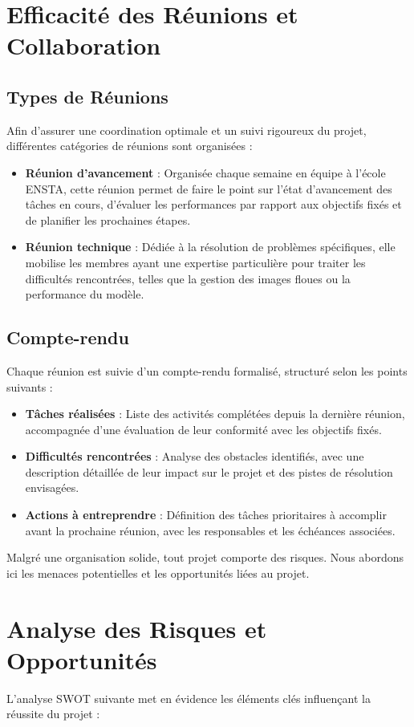 \section{Efficacité des Réunions et Collaboration}
\subsection{Types de Réunions}  
Afin d'assurer une coordination optimale et un suivi rigoureux du projet, différentes catégories de réunions sont organisées :  
\begin{itemize}  
    \item \textbf{Réunion d’avancement} : Organisée chaque semaine en équipe à l’école ENSTA, cette réunion permet de faire le point sur l’état d’avancement des tâches en cours, d’évaluer les performances par rapport aux objectifs fixés et de planifier les prochaines étapes.  
    \item \textbf{Réunion technique} : Dédiée à la résolution de problèmes spécifiques, elle mobilise les membres ayant une expertise particulière pour traiter les difficultés rencontrées, telles que la gestion des images floues ou la performance du modèle.   
\end{itemize}  

\subsection{Compte-rendu}  
Chaque réunion est suivie d’un compte-rendu formalisé, structuré selon les points suivants :  
\begin{itemize}  
    \item \textbf{Tâches réalisées} : Liste des activités complétées depuis la dernière réunion, accompagnée d’une évaluation de leur conformité avec les objectifs fixés.  
    \item \textbf{Difficultés rencontrées} : Analyse des obstacles identifiés, avec une description détaillée de leur impact sur le projet et des pistes de résolution envisagées.  
    \item \textbf{Actions à entreprendre} : Définition des tâches prioritaires à accomplir avant la prochaine réunion, avec les responsables et les échéances associées.  
\end{itemize}  
Malgré une organisation solide, tout projet comporte des risques. Nous abordons ici les menaces potentielles et les opportunités liées au projet.

\section{Analyse des Risques et Opportunités}
L’analyse SWOT suivante met en évidence les éléments clés influençant la réussite du projet :  


